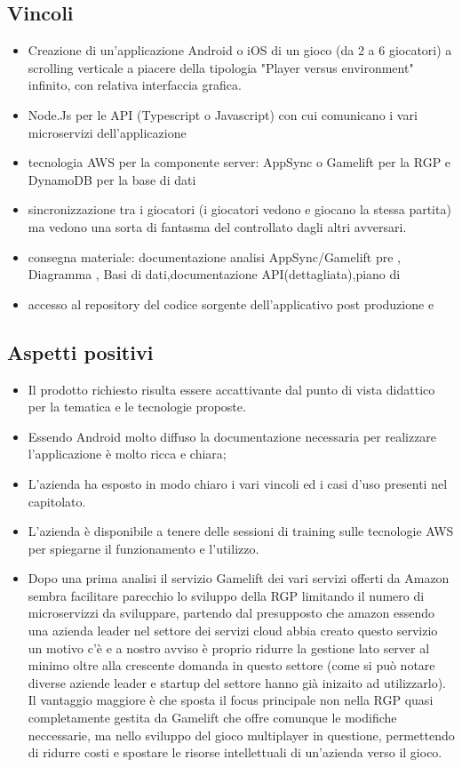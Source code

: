 \subsection{Vincoli}
\begin{itemize}
\item Creazione di un'applicazione Android o iOS di un gioco (da 2 a 6 giocatori) a scrolling verticale a piacere della tipologia "Player versus environment" infinito, con relativa interfaccia grafica.
\item Node.Js per le API (Typescript o Javascript) con cui comunicano i vari microservizi dell'applicazione
\item tecnologia AWS per la componente server: AppSync o Gamelift per la RGP e DynamoDB per la base di dati    
\item sincronizzazione  tra i giocatori (i giocatori vedono e giocano la stessa partita) ma vedono una sorta di fantasma del  controllato dagli altri avversari.
\item consegna materiale: documentazione analisi AppSync/Gamelift pre , Diagramma  , Basi di dati,documentazione API(dettagliata),piano di 
\item accesso al repository del codice sorgente dell'applicativo post produzione e  
\end{itemize}

\subsection{Aspetti positivi}
\begin{itemize}
\item Il prodotto richiesto risulta essere accattivante dal punto di vista didattico per la tematica e le tecnologie proposte.
\item Essendo Android molto diffuso la documentazione necessaria per realizzare l'applicazione è molto ricca e chiara;
\item L'azienda ha esposto in modo chiaro i vari vincoli ed i casi d'uso presenti nel capitolato.
\item L'azienda \`e disponibile a tenere delle sessioni di training sulle tecnologie AWS per spiegarne il funzionamento e l'utilizzo.
\item Dopo una prima analisi il servizio Gamelift dei vari servizi offerti da Amazon sembra facilitare parecchio lo sviluppo della RGP limitando il numero di microservizzi da sviluppare, partendo dal
presupposto che amazon essendo una azienda leader nel settore dei servizi cloud abbia creato questo servizio un motivo c'è e a nostro avviso è proprio 
ridurre la gestione lato server al minimo oltre alla crescente domanda in questo settore (come si può notare diverse aziende leader e startup del settore hanno già inizaito ad utilizzarlo).
Il vantaggio maggiore è che sposta il focus principale non nella RGP quasi completamente gestita da Gamelift che offre comunque le modifiche neccessarie, ma nello sviluppo del gioco multiplayer 
in questione, permettendo di ridurre costi e spostare le risorse intellettuali di un’azienda verso il gioco.
\end{itemize}

